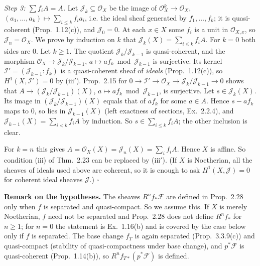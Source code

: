 \documentclass[11pt]{article}
\begin{document}
\emph{Step 3: $\sum f_iA=A$.} Let $\mathcal J_k\subseteq\mathcal O_X$ be the image of $\mathcal O_X^k\to\mathcal O_X$, $(a_1,\dots,a_k)\mapsto\sum_{i\le k}f_ia_i$, i.e. the ideal sheaf generated by $f_1,\dots,f_k$; it is quasi-coherent (Prop.~1.12(c)), and $\mathcal J_0=0$. At each $x\in X$ some $f_i$ is a unit in $\mathcal O_{X,x}$, so $\mathcal J_n=\mathcal O_X$. We prove by induction on $k$ that $\mathcal J_k(X)=\sum_{i\le k}f_iA$. For $k=0$ both sides are $0$. Let $k\ge1$. The quotient $\mathcal J_k/\mathcal J_{k-1}$ is quasi-coherent, and the morphism $\mathcal O_X\to\mathcal J_k/\mathcal J_{k-1}$, $a\mapsto af_k\bmod\mathcal J_{k-1}$ is surjective. Its kernel $\mathcal I'=(\mathcal J_{k-1}:f_k)$ is a quasi-coherent sheaf of \emph{ideals} (Prop.~1.12(c)), so $H^1(X,\mathcal I')=0$ by (iii$'$). Prop.~2.15 for $0\to\mathcal I'\to\mathcal O_X\to\mathcal J_k/\mathcal J_{k-1}\to0$ shows that $A\to(\mathcal J_k/\mathcal J_{k-1})(X)$, $a\mapsto af_k\bmod\mathcal J_{k-1}$, is surjective. Let $s\in\mathcal J_k(X)$. Its image in $(\mathcal J_k/\mathcal J_{k-1})(X)$ equals that of $af_k$ for some $a\in A$. Hence $s-af_k$ maps to $0$, so lies in $\mathcal J_{k-1}(X)$ (left exactness of sections, Ex.~2.2.4), and $\mathcal J_{k-1}(X)=\sum_{i<k}f_iA$ by induction. So $s\in\sum_{i\le k}f_iA$; the other inclusion is clear.

For $k=n$ this gives $A=\mathcal O_X(X)=\mathcal J_n(X)=\sum_if_iA$. Hence $X$ is affine. So condition (iii) of Thm.~2.23 can be replaced by (iii$'$). (If $X$ is Noetherian, all the sheaves of ideals used above are coherent, so it is enough to ask $H^1(X,\mathcal J)=0$ for coherent ideal sheaves $\mathcal J$.) \hfill$\square$

\pf
\textbf{Remark on the hypotheses.} The sheaves $R^nf_*\mathcal F$ are defined in Prop.~2.28 only when $f$ is separated and quasi-compact. So we assume this. If $X$ is merely Noetherian, $f$ need not be separated and Prop.~2.28 does not define $R^nf_*$ for $n\ge1$; for $n=0$ the statement is Ex.~1.16(b) and is covered by the case below only if $f$ is separated. The base change $f_T$ is again separated (Prop.~3.3.9(c)) and quasi-compact (stability of quasi-compactness under base change), and $p^*\mathcal F$ is quasi-coherent (Prop.~1.14(b)), so $R^nf_{T*}(p^*\mathcal F)$ is defined.
\end{document}
